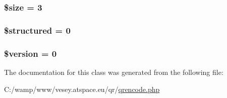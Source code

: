 \hypertarget{class_q_rencode_af594986e4618a8d6a5d7566617f583c6}{
\subsubsection[{\$size}]{\setlength{\rightskip}{0pt plus 5cm}\$size = 3}}\label{class_q_rencode_af594986e4618a8d6a5d7566617f583c6}
\hypertarget{class_q_rencode_ad7eb64c756edb0b0e7973b6967d94ebc}{
\subsubsection[{\$structured}]{\setlength{\rightskip}{0pt plus 5cm}\$structured = 0}}\label{class_q_rencode_ad7eb64c756edb0b0e7973b6967d94ebc}
\hypertarget{class_q_rencode_a17c8948c68aa44fa9961ae169b6a8961}{
\subsubsection[{\$version}]{\setlength{\rightskip}{0pt plus 5cm}\$version = 0}}\label{class_q_rencode_a17c8948c68aa44fa9961ae169b6a8961}


The documentation for this class was generated from the following file\-:\begin{DoxyCompactItemize}
\item 
C\-:/wamp/www/vesey.\-atspace.\-eu/qr/\hyperlink{qrencode_8php}{qrencode.\-php}\end{DoxyCompactItemize}
